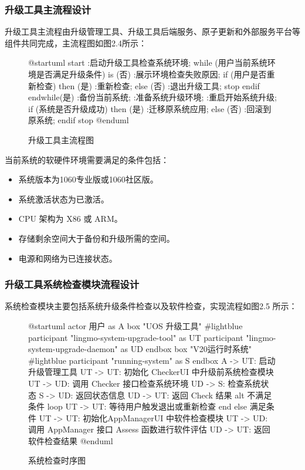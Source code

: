 \documentclass{utart}
\begin{document}
\subsubsection{升级工具主流程设计}
升级工具主流程由升级管理工具、升级工具后端服务、原子更新和外部服务平台等组件共同完成，主流程图如图2.4所示：
\begin{figure}[H]
    \centering
    \begin{plantuml}
        @startuml
            start
            :启动升级工具检查系统环境;
            while (用户当前系统环境是否满足升级条件) is (否)
            :展示环境检查失败原因;
            if (用户是否重新检查) then (是)
            :重新检查;
            else (否)
            :退出升级工具;
            stop
            endif
            endwhile(是)
            :备份当前系统;
            :准备系统升级环境;
            :重启开始系统升级;
            if (系统是否升级成功) then (是)
            :迁移原系统应用;
            else (否)
            :回滚到原系统;
            endif
            stop
        @enduml
    \end{plantuml}
    \caption{升级工具主流程图}
    \label{fig:main}
\end{figure}

当前系统的软硬件环境需要满足的条件包括：
\begin{itemize}
    \item 系统版本为1060专业版或1060社区版。
    \item 系统激活状态为已激活。
    \item CPU 架构为 X86 或 ARM。
    \item 存储剩余空间大于备份和升级所需的空间。
    \item 电源和网络为已连接状态。
\end{itemize}

\subsubsection{升级工具系统检查模块流程设计}
系统检查模块主要包括系统升级条件检查以及软件检查，实现流程如图2.5 所示：
\begin{figure}[H]
    \centering
    \begin{plantuml}
        @startuml
        actor 用户 as A 
        box "UOS 升级工具" #lightblue
        participant "lingmo-system-upgrade-tool" as UT
        participant "lingmo-system-upgrade-daemon" as UD                             
        endbox
        box "V20运行时系统" #lightblue
        participant "running-system" as S
        endbox
        A -> UT: 启动升级管理工具
        UT -> UT: 初始化 CheckerUI 中升级前系统检查模块
        UT -> UD: 调用 Checker 接口检查系统环境
        UD -> S: 检查系统状态
        S -> UD: 返回状态信息
        UD -> UT: 返回 Check 结果  
        alt 不满足条件
        loop
        UT -> UT: 等待用户触发退出或重新检查
        end
        else 满足条件
        UT -> UT: 初始化AppManagerUI 中软件检查模块
        UT -> UD: 调用 AppManager 接口 Assess 函数进行软件评估
        UD -> UT: 返回软件检查结果
        @enduml
    \end{plantuml}
    \caption{系统检查时序图}
    \label{fig:systemcheck}
\end{figure}
\end{document}
